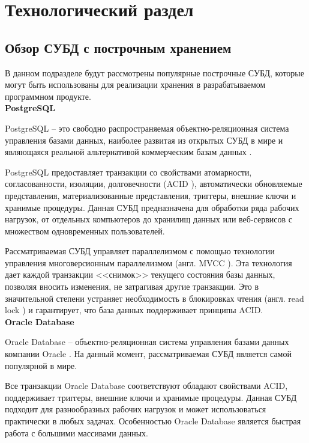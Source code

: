 \chapter{Технологический раздел}

\section{Обзор СУБД с построчным хранением}

В данном подразделе будут рассмотрены популярные построчные СУБД, которые могут быть использованы для реализации хранения в разрабатываемом программном продукте.\\

\noindent\textbf{PostgreSQL}

PostgreSQL \cite{postgresql} -- это свободно распространяемая объектно-реляционная система управления базами данных, наиболее развитая из открытых СУБД в мире и являющаяся реальной альтернативой коммерческим базам данных \cite{postgresql-fact}.

PostgreSQL предоставляет транзакции со свойствами атомарности, согласованности, изоляции, долговечности (ACID \cite{acid}), автоматически обновляемые представления, материализованные представления, триггеры, внешние ключи и хранимые процедуры. Данная СУБД предназначена для обработки ряда рабочих нагрузок, от отдельных компьютеров до хранилищ данных или веб-сервисов с множеством одновременных пользователей. 

Рассматриваемая СУБД управляет параллелизмом с помощью технологии управления многоверсионным параллелизмом (англ. MVCC \cite{mvcc}). Эта технология дает каждой транзакции <<снимок>> текущего состояния базы данных, позволяя вносить изменения, не затрагивая другие транзакции. Это в значительной степени устраняет необходимость в блокировках чтения (англ. read lock \cite{r-lock}) и гарантирует, что база данных поддерживает принципы ACID. \\

\noindent\textbf{Oracle Database}

Oracle Database \cite{oracle} -- объектно-реляционная система управления базами данных компании Oracle \cite{oracle-company}. На данный момент, рассматриваемая СУБД является самой популярной в мире. \cite{oracle-popular}

Все транзакции Oracle Database соответствуют обладают свойствами ACID, поддерживает триггеры, внешние ключи и хранимые процедуры. Данная СУБД подходит для разнообразных рабочих нагрузок и может использоваться практически в любых задачах. Особенностью Oracle Database является быстрая работа с большими массивами данных.


